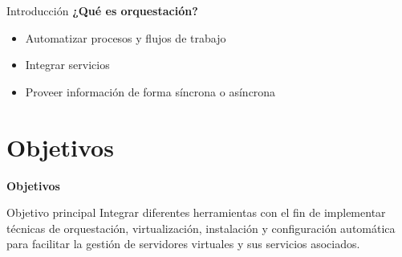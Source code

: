 \begin{frame}{Introducción}
    \vspace{0cm}
    \textbf{¿Qué es orquestación?}
    \begin{itemize}
        \item Automatizar procesos y flujos de trabajo
        \item Integrar servicios
        \item Proveer información de forma síncrona o asíncrona
    \end{itemize}

\end{frame}
\section{Objetivos}

\begin{frame}
    \Huge
    \centering
    \textbf{Objetivos}

\end{frame}

\begin{frame}{Objetivo principal}
    \vspace{0cm}
    Integrar diferentes herramientas con el fin de implementar técnicas de orquestación, virtualización, instalación y configuración automática para facilitar la gestión de servidores virtuales y sus servicios asociados.

\end{frame}

%
%


